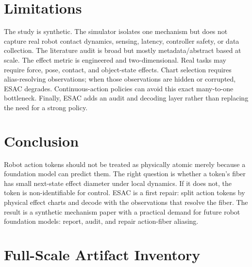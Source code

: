 \documentclass{article}
\begin{document}
\section{Limitations}

The study is synthetic. The simulator isolates one mechanism but does not
capture real robot contact dynamics, sensing, latency, controller safety, or
data collection. The literature audit is broad but mostly metadata/abstract
based at scale. The effect metric is engineered and two-dimensional. Real tasks
may require force, pose, contact, and object-state effects. Chart selection
requires alias-resolving observations; when those observations are hidden or
corrupted, ESAC degrades. Continuous-action policies can avoid this exact
many-to-one bottleneck. Finally, ESAC adds an audit and decoding layer rather
than replacing the need for a strong policy.

\section{Conclusion}

Robot action tokens should not be treated as physically atomic merely because a
foundation model can predict them. The right question is whether a token's
fiber has small next-state effect diameter under local dynamics. If it does
not, the token is non-identifiable for control. ESAC is a first repair: split
action tokens by physical effect charts and decode with the observations that
resolve the fiber. The result is a synthetic mechanism paper with a practical
demand for future robot foundation models: report, audit, and repair
action-fiber aliasing.




\appendix
\renewcommand{\thesection}{A.\arabic{section}}

\section{Full-Scale Artifact Inventory}
\end{document}
